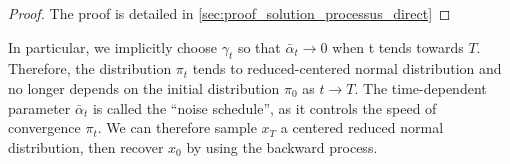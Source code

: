 \documentclass[a4paper,10pt]{article}
\theoremstyle{definition} %
\theoremstyle{definition} %
\newtheorem{proposition}[definition]{Proposition}
\theoremstyle{definition} %
\theoremstyle{definition} %
\newcommand{\R}{\mathbb{R}}
\newcommand{\0}{\boldsymbol{0}}
\begin{document}
\begin{proof}
    The proof is detailed in \cref{sec:proof_solution_processus_direct}
\end{proof}
In particular, we implicitly choose $\gamma_t$ so that $\bar \alpha_t \rightarrow 0$ when t tends towards $T$. Therefore, the distribution $\pi_t$ tends to reduced-centered normal distribution and no longer depends on the initial  distribution $\pi_0$ as $t \rightarrow T$. The time-dependent parameter $\bar \alpha_t$ is called the “noise schedule”, as it controls the speed of convergence $\pi_t$. We can therefore sample $x_T$ a centered reduced normal distribution, then recover $x_0$ by using the backward process.



\end{document}
